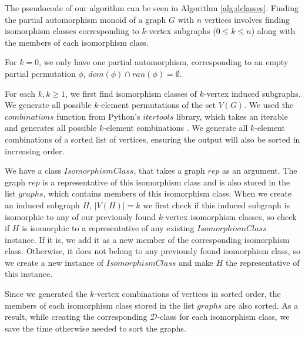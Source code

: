 The pseudocode of our algorithm can be seen in Algorithm \ref{alg:dclasses}. Finding the partial automorphism monoid of a graph $G$ with $n$ vertices involves finding isomorphism classes corresponding to $k$-vertex subgraphs ($0 \leq k \leq n$) along with the members of each isomorphism class.

For $k = 0$, we only have one partial automorphism, corresponding to an empty partial permutation $\phi$, $dom(\phi) \cap ran(\phi) = \emptyset$.

For each $k, k \geq 1$, we first find isomorphism classes of $k$-vertex induced subgraphs. We generate all possible $k$-element permutations of the set $V(G)$. We used the $combinations$ function from Python's $itertools$ library, which takes an iterable and generates all possible $k$-element combinations \cite{itercomb}. We generate all $k$-element combinations of a sorted list of vertices, ensuring the output will also be sorted in increasing order.

We have a class $IsomorphismClass$, that takes a graph $rep$ as an argument. The graph $rep$ is a representative of this isomorphism class and is also stored in the list $graphs$, which contains members of this isomorphism class. When we create an induced subgraph $H$, $|V(H)| = k$ we first check if this induced subgraph is isomorphic to any of our previously found $k$-vertex isomorphism classes, so check if $H$ is isomorphic to a representative of any existing $IsomorphismClass$ instance. If it is, we add it as a new member of the corresponding isomorphism class. Otherwise, it does not belong to any previously found isomorphism class, so we create a new instance of $IsomorphismClass$ and make $H$ the representative of this instance.

Since we generated the $k$-vertex combinations of vertices in sorted order, the members of each isomorphism class stored in the list $graphs$ are also sorted. As a result, while creating the corresponding $\mathcal{D}$-class for each isomorphism class, we save the time otherwise needed to sort the graphs.

